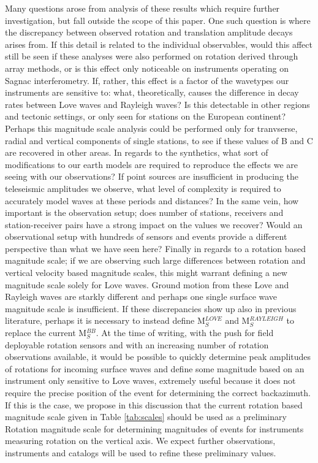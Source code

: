 \documentclass{gji}
\begin{document}
Many questions arose from analysis of these results which require further investigation, but fall outside the scope of this paper. One such question is where the discrepancy between observed rotation and translation amplitude decays arises from. If this detail is related to the individual observables, would this affect still be seen if these analyses were also performed on rotation derived through array methods, or is this effect only noticeable on instruments operating on Sagnac interferometry. If, rather, this effect is a factor of the wavetypes our instruments are sensitive to: what, theoretically, causes the difference in decay rates between Love waves and Rayleigh waves? Is this detectable in other regions and tectonic settings, or only seen for stations on the European continent? Perhaps this magnitude scale analysis could be performed only for tranvserse, radial and vertical components of single stations, to see if these values of B and C are recovered in other areas. In regards to the synthetics, what sort of modifications to our earth models are required to reproduce the effects we are seeing with our observations? If point sources are insufficient in producing the teleseismic amplitudes we observe, what level of complexity is required to accurately model waves at these periods and distances? In the same vein, how important is the observation setup; does number of stations, receivers and station-receiver pairs have a strong impact on the values we recover? Would an observational setup with hundreds of sensors and events provide a different perspective than what we have seen here? Finally in regards to a rotation based magnitude scale; if we are observing such large differences between rotation and vertical velocity based magnitude scales, this might warrant defining a new magnitude scale solely for Love waves. Ground motion from these Love and Rayleigh waves are starkly different and perhaps one single surface wave magnitude scale is insufficient. If these discrepancies show up also in previous literature, perhaps it is necessary to instead define M$_S^{LOVE}$ and M$_S^{RAYLEIGH}$ to replace the current M$_S^{BB}$. At the time of writing, with the push for field deployable rotation sensors and with an increasing number of rotation observations available, it would be possible to quickly determine peak amplitudes of rotations for incoming surface waves and define some magnitude based on an instrument only sensitive to Love waves, extremely useful because it does not require the precise position of the event for determining the correct backazimuth. If this is the case, we propose in this discussion that the current rotation based magnitude scale given in Table \ref{tab:scales} should be used as a preliminary Rotation magnitude scale for determining magnitudes of events for instruments measuring rotation on the vertical axis. We expect further observations, instruments and catalogs will be used to refine these preliminary values.
\end{document}
